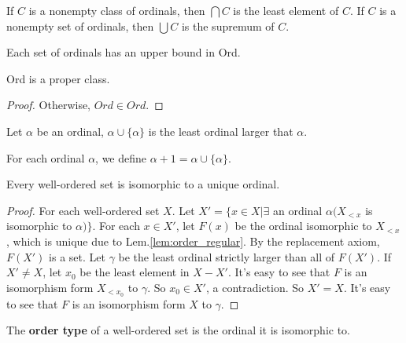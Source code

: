 \documentclass[12pt]{book}
\begin{document}
\begin{corollary}
                                                                                                                                                                                                                                                                                                                                                                                                                                              
\end{corollary}

\begin{lemma}
	If $C$ is a nonempty class of ordinals, then $\bigcap C$ is the least element of $C$. If $C$ is a nonempty set of ordinals, then $\bigcup C$ is the supremum of $C$.
\end{lemma}
\begin{corollary}
	Each set of ordinals has an upper bound in Ord.
\end{corollary}

\begin{lemma}
	Ord is a proper class.
\end{lemma}
\begin{proof}
	Otherwise, $Ord\in Ord$.
\end{proof}

\begin{lemma}
	Let $\alpha$ be an ordinal, $\alpha\cup\{\alpha\}$ is the least ordinal larger that $\alpha$.
\end{lemma}

\begin{definition}
	For each ordinal $\alpha$, we define $\alpha+1=\alpha\cup\{\alpha\}$.
\end{definition}

\begin{theorem}
	Every well-ordered set is isomorphic to a unique ordinal.\end{theorem}
\begin{proof}
	For each well-ordered set $X$. Let $X'=\{x\in X|\exists$ an ordinal $\alpha(X_{<x} $ is isomorphic to $\alpha)\}$. For each $x\in X'$, let $F(x)$ be the ordinal isomorphic to $X_{<x}$, which is unique due to Lem.\ref{lem:order_regular}. By the replacement axiom, $F(X')$ is a set. Let $\gamma$ be the least ordinal strictly larger than all of $F(X')$. If $X'\neq X$, let $x_0$ be the least element in $X-X'$. It's easy to see that $F$ is an isomorphism form $X_{<x_0}$ to $\gamma$. So $x_0\in X'$, a contradiction. So $X'=X$. It's easy to see that $F$ is an isomorphism form $X$ to $\gamma$.
\end{proof}
\begin{definition}
	The {\bf order type} of a well-ordered set is the ordinal it is isomorphic to.
\end{definition}
\end{document}
